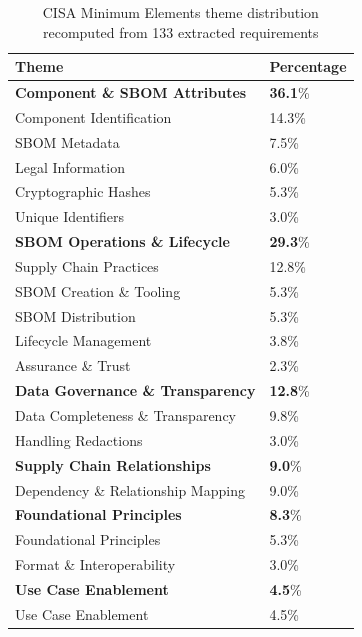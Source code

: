\begin{table}[t]
\caption{CISA Minimum Elements theme distribution recomputed from 133 extracted requirements}
\label{tab:cisa_theme_distribution}
\centering
\footnotesize
\begin{tabular}{@{}ll@{}}
\toprule
\textbf{Theme} & \textbf{Percentage} \\
\midrule

\textbf{Component \& SBOM Attributes} & \textbf{36.1}\% \\
\hspace{1.5em}Component Identification & 14.3\% \\
\hspace{1.5em}SBOM Metadata & 7.5\% \\
\hspace{1.5em}Legal Information & 6.0\% \\
\hspace{1.5em}Cryptographic Hashes & 5.3\% \\
\hspace{1.5em}Unique Identifiers & 3.0\% \\

\textbf{SBOM Operations \& Lifecycle} & \textbf{29.3}\% \\
\hspace{1.5em}Supply Chain Practices & 12.8\% \\
\hspace{1.5em}SBOM Creation \& Tooling & 5.3\% \\
\hspace{1.5em}SBOM Distribution & 5.3\% \\
\hspace{1.5em}Lifecycle Management & 3.8\% \\
\hspace{1.5em}Assurance \& Trust & 2.3\% \\

\textbf{Data Governance \& Transparency} & \textbf{12.8}\% \\
\hspace{1.5em}Data Completeness \& Transparency & 9.8\% \\
\hspace{1.5em}Handling Redactions & 3.0\% \\

\textbf{Supply Chain Relationships} & \textbf{9.0}\% \\
\hspace{1.5em}Dependency \& Relationship Mapping & 9.0\% \\

\textbf{Foundational Principles} & \textbf{8.3}\% \\
\hspace{1.5em}Foundational Principles & 5.3\% \\
\hspace{1.5em}Format \& Interoperability & 3.0\% \\

\textbf{Use Case Enablement} & \textbf{4.5}\% \\
\hspace{1.5em}Use Case Enablement & 4.5\% \\

\bottomrule
\end{tabular}
\end{table}
